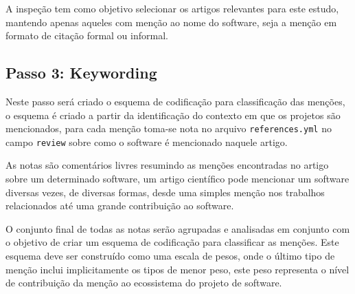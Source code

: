 A inspeção tem como objetivo selecionar os artigos relevantes para este estudo,
mantendo apenas aqueles com menção ao nome do software, seja a menção em
formato de citação formal ou informal.



\subsection{Passo 3: Keywording}


Neste passo será criado o esquema de codificação para classificação das
menções, o esquema é criado a partir da identificação do contexto em que os
projetos são mencionados, para cada menção toma-se nota no arquivo
\texttt{references.yml} no campo \texttt{review} sobre como o software é
mencionado naquele artigo.

As notas são comentários livres resumindo as menções encontradas no artigo
sobre um determinado software, um artigo científico pode mencionar um software
diversas vezes, de diversas formas, desde uma simples menção nos trabalhos
relacionados até uma grande contribuição ao software.

O conjunto final de todas as notas serão agrupadas e analisadas em conjunto com
o objetivo de criar um esquema de codificação para classificar as menções.
Este esquema deve ser construído como uma escala de pesos, onde o último tipo
de menção inclui implicitamente os tipos de menor peso, este peso representa
o nível de contribuição da menção ao ecossistema do projeto de software.




